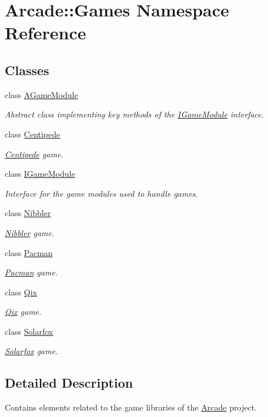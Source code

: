 \hypertarget{namespaceArcade_1_1Games}{}\section{Arcade\+::Games Namespace Reference}
\label{namespaceArcade_1_1Games}
\subsection*{Classes}
\begin{DoxyCompactItemize}
\item 
class \mbox{\hyperlink{classArcade_1_1Games_1_1AGameModule}{A\+Game\+Module}}
\begin{DoxyCompactList}\small\item\em Abstract class implementing key methods of the \mbox{\hyperlink{classArcade_1_1Games_1_1IGameModule}{I\+Game\+Module}} interface. \end{DoxyCompactList}\item 
class \mbox{\hyperlink{classArcade_1_1Games_1_1Centipede}{Centipede}}
\begin{DoxyCompactList}\small\item\em \mbox{\hyperlink{classArcade_1_1Games_1_1Centipede}{Centipede}} game. \end{DoxyCompactList}\item 
class \mbox{\hyperlink{classArcade_1_1Games_1_1IGameModule}{I\+Game\+Module}}
\begin{DoxyCompactList}\small\item\em Interface for the game modules used to handle games. \end{DoxyCompactList}\item 
class \mbox{\hyperlink{classArcade_1_1Games_1_1Nibbler}{Nibbler}}
\begin{DoxyCompactList}\small\item\em \mbox{\hyperlink{classArcade_1_1Games_1_1Nibbler}{Nibbler}} game. \end{DoxyCompactList}\item 
class \mbox{\hyperlink{classArcade_1_1Games_1_1Pacman}{Pacman}}
\begin{DoxyCompactList}\small\item\em \mbox{\hyperlink{classArcade_1_1Games_1_1Pacman}{Pacman}} game. \end{DoxyCompactList}\item 
class \mbox{\hyperlink{classArcade_1_1Games_1_1Qix}{Qix}}
\begin{DoxyCompactList}\small\item\em \mbox{\hyperlink{classArcade_1_1Games_1_1Qix}{Qix}} game. \end{DoxyCompactList}\item 
class \mbox{\hyperlink{classArcade_1_1Games_1_1Solarfox}{Solarfox}}
\begin{DoxyCompactList}\small\item\em \mbox{\hyperlink{classArcade_1_1Games_1_1Solarfox}{Solarfox}} game. \end{DoxyCompactList}\end{DoxyCompactItemize}


\subsection{Detailed Description}
Contains elements related to the game libraries of the \mbox{\hyperlink{namespaceArcade}{Arcade}} project. 